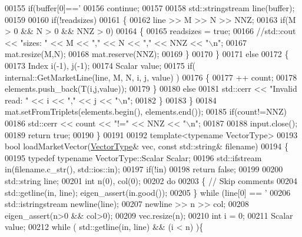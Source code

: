 \begin{DoxyCode}
{00155     \textcolor{keywordflow}{if}(buffer[0]==\textcolor{charliteral}{'%
00156       \textcolor{keywordflow}{continue};
00157     
00158     std::stringstream line(buffer);
00159     
00160     \textcolor{keywordflow}{if}(!readsizes)
00161     \{
00162       line >> M >> N >> NNZ;
00163       \textcolor{keywordflow}{if}(M > 0 && N > 0 && NNZ > 0) 
00164       \{
00165         readsizes = \textcolor{keyword}{true};
00166         \textcolor{comment}{//std::cout << "sizes: " << M << "," << N << "," << NNZ << "\(\backslash\)n";}
00167         mat.resize(M,N);
00168         mat.reserve(NNZ);
00169       \}
00170     \}
00171     \textcolor{keywordflow}{else}
00172     \{ 
00173       Index i(-1), j(-1);
00174       Scalar value; 
00175       \textcolor{keywordflow}{if}( internal::GetMarketLine(line, M, N, i, j, value) ) 
00176       \{
00177         ++ count;
00178         elements.push\_back(T(i,j,value));
00179       \}
00180       \textcolor{keywordflow}{else} 
00181         std::cerr << \textcolor{stringliteral}{"Invalid read: "} << i << \textcolor{stringliteral}{","} << j << \textcolor{stringliteral}{"\(\backslash\)n"};        
00182     \}
00183   \}
00184   mat.setFromTriplets(elements.begin(), elements.end());
00185   \textcolor{keywordflow}{if}(count!=NNZ)
00186     std::cerr << count << \textcolor{stringliteral}{"!="} << NNZ << \textcolor{stringliteral}{"\(\backslash\)n"};
00187   
00188   input.close();
00189   \textcolor{keywordflow}{return} \textcolor{keyword}{true};
00190 \}
00191 
00192 \textcolor{keyword}{template}<\textcolor{keyword}{typename} VectorType>
00193 \textcolor{keywordtype}{bool} loadMarketVector(\hyperlink{struct_vector_type}{VectorType}& vec, \textcolor{keyword}{const} std::string& filename)
00194 \{
00195    \textcolor{keyword}{typedef} \textcolor{keyword}{typename} VectorType::Scalar Scalar;
00196   std::ifstream in(filename.c\_str(), std::ios::in);
00197   \textcolor{keywordflow}{if}(!in)
00198     \textcolor{keywordflow}{return} \textcolor{keyword}{false};
00199   
00200   std::string line; 
00201   \textcolor{keywordtype}{int} n(0), col(0); 
00202   \textcolor{keywordflow}{do} 
00203   \{ \textcolor{comment}{// Skip comments}
00204     std::getline(in, line); eigen\_assert(in.good());
00205   \} \textcolor{keywordflow}{while} (line[0] == \textcolor{charliteral}{'%
00206   std::istringstream newline(line);
00207   newline  >> n >> col; 
00208   eigen\_assert(n>0 && col>0);
00209   vec.resize(n);
00210   \textcolor{keywordtype}{int} i = 0; 
00211   Scalar value; 
00212   \textcolor{keywordflow}{while} ( std::getline(in, line) && (i < n) )\{
}}}
\end{DoxyCode}
